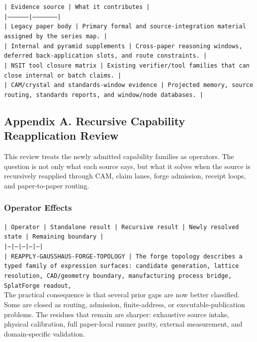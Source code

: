 \documentclass[11pt]{article}
\begin{document}
\noindent\texttt{| Evidence source | What it contributes |}\\
\noindent\texttt{|-----------------|---------------------|}\\
\noindent\texttt{| Legacy paper body | Primary formal and source-integration material assigned by the series map. |}\\
\noindent\texttt{| Internal and pyramid supplements | Cross-paper reasoning windows, deferred back-application slots, and route constraints. |}\\
\noindent\texttt{| NSIT tool closure matrix | Existing verifier/tool families that can close internal or batch claims. |}\\
\noindent\texttt{| CAM/crystal and standards-window evidence | Projected memory, source routing, standards reports, and window/node databases. |}\\

\subsection*{Appendix A. Recursive Capability Reapplication Review}

This review treats the newly admitted capability families as operators. The question is not only what each source says, but what it solves when the source is recursively reapplied through CAM, claim lanes, forge admission, receipt loops, and paper-to-paper routing.

\subsubsection*{Operator Effects}

\noindent\texttt{| Operator | Standalone result | Recursive result | Newly resolved state | Remaining boundary |}\\
\noindent\texttt{|---|---|---|---|---|}\\
\noindent\texttt{| REAPPLY-GAUSSHAUS-FORGE-TOPOLOGY | The forge topology describes a typed family of expression surfaces: candidate generation, lattice resolution, CAD/geometry boundary, manufacturing process bridge, SplatForge readout, }\\

The practical consequence is that several prior gaps are now better classified. Some are closed as routing, admission, finite-address, or executable-publication problems. The residues that remain are sharper: exhaustive source intake, physical calibration, full paper-local runner parity, external measurement, and domain-specific validation.
\end{document}
